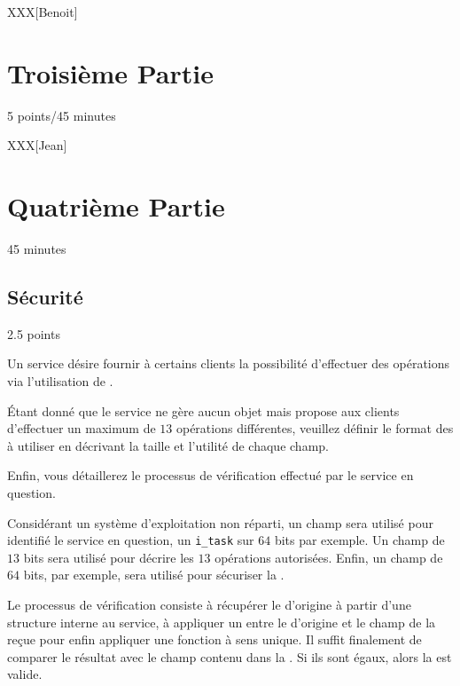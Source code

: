 XXX[Benoit]

%
%

\section{Troisi\`eme Partie}
{\hfill{} \scriptsize{5 points/45 minutes}}

XXX[Jean]

%
%

\section{Quatri\`eme Partie}
{\hfill{} \scriptsize{45 minutes}}

%
%
\subsection{S\'ecurit\'e}
{\hfill{} \scriptsize{2.5 points}}

Un service d\'esire fournir \`a certains clients la possibilit\'e
d'effectuer des op\'erations via l'utilisation de .

\'Etant donn\'e que le service ne g\`ere aucun objet mais propose
aux clients d'effectuer un maximum de $13$ op\'erations diff\'erentes,
veuillez d\'efinir le format des  \`a utiliser en
d\'ecrivant la taille et l'utilit\'e de chaque champ.

Enfin, vous d\'etaillerez le processus de v\'erification effectu\'e
par le service en question.

\begin{correction}

Consid\'erant un syst\`eme d'exploitation non r\'eparti, un champ sera
utilis\'e pour identifi\'e le service en question, un \texttt{i\_task}
sur $64$ bits par exemple. Un champ de $13$ bits sera utilis\'e pour
d\'ecrire les $13$ op\'erations autoris\'ees. Enfin, un champ 
de $64$ bits, par exemple, sera utilis\'e pour s\'ecuriser la
.

Le processus de v\'erification consiste \`a r\'ecup\'erer le 
d'origine \`a partir d'une structure interne au service, \`a appliquer un
 entre le  d'origine et le champ 
de la  re\c{c}ue pour enfin appliquer une fonction
\`a sens unique. Il suffit finalement de comparer le r\'esultat avec le
champ  contenu dans la . Si ils sont
\'egaux, alors la  est valide.

\end{correction}

